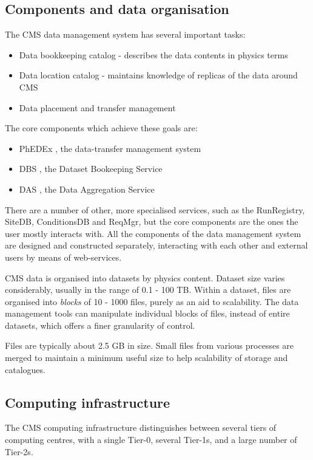 \subsection{Components and data organisation}
The CMS data management system has several important tasks:
\begin{itemize}
  \item Data bookkeeping catalog - describes the data contents in physics terms
  \item Data location catalog - maintains knowledge of replicas of the data around CMS
  \item Data placement and transfer management
\end{itemize}

The core components which achieve these goals are:
\begin{itemize}
  \item PhEDEx \cite{PhEDEx}, the data-transfer management system
  \item DBS \cite{DBS}, the Dataset Bookeeping Service
  \item DAS \cite{DAS}, the Data Aggregation Service
\end{itemize}

There are a number of other, more specialised services, such as the RunRegistry, SiteDB, 
ConditionsDB and ReqMgr, but the core components are the ones the user mostly interacts with. All 
the components of the data management system are designed and constructed separately, interacting 
with each other and external users by means of web-services.

CMS data is organised into datasets by physics content. Dataset size varies considerably, usually 
in the range of 0.1 - 100 TB. Within a dataset, files are organised into {\it blocks} of 10 - 1000 
files, purely as an aid to scalability. The data management tools can manipulate individual blocks 
of files, instead of entire datasets, which offers a finer granularity of control.

Files are typically about 2.5 GB in size. Small files from various processes are merged to 
maintain a minimum useful size to help scalability of storage and catalogues.

\subsection{Computing infrastructure}
The CMS computing infrastructure distinguishes between several tiers of computing centres, with a
single Tier-0, several Tier-1s, and a large number of Tier-2s.

